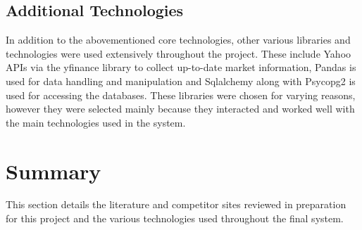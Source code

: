     \subsection{Additional Technologies}
    In addition to the abovementioned core technologies, other various libraries and technologies were used extensively throughout the project. These include Yahoo APIs via the yfinance \citep{technology:yfinance} library to collect up-to-date market information, Pandas \citep{technology:Pandas} is used for data handling and manipulation and Sqlalchemy \citep{technology:sqlalchemy} along with Psycopg2 \cite{technology:psycopg2} is used for accessing the databases. These libraries were chosen for varying reasons, however they were selected mainly because they interacted and worked well with the main technologies used in the system. 
    

\section{Summary}
   This section details the literature and competitor sites reviewed in preparation for this project and the various technologies used throughout the final system.  
